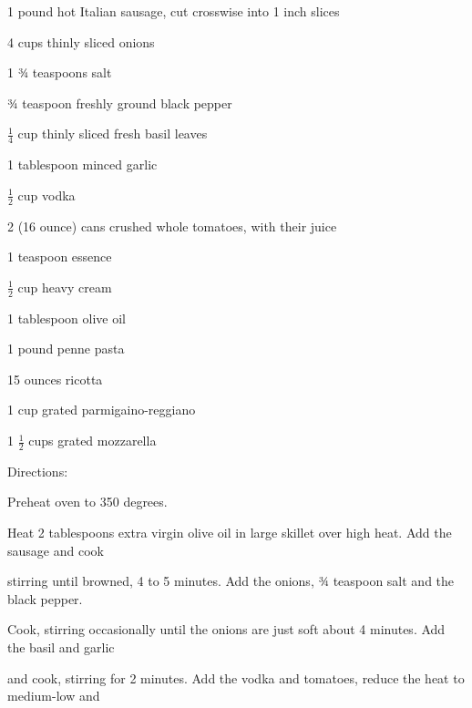 \documentclass[a4paper,portrait,12pt]{book}
\begin{document}
1 pound hot Italian sausage, cut crosswise into 1 inch slices




4 cups thinly sliced onions




1 ¾ teaspoons salt




¾ teaspoon freshly ground black pepper




$\frac{1}{4}$ cup thinly sliced fresh basil leaves




1 tablespoon minced garlic




$\frac{1}{2}$ cup vodka




2 (16 ounce) cans crushed whole tomatoes, with their juice




1 teaspoon essence




$\frac{1}{2}$ cup heavy cream




1 tablespoon olive oil




1 pound penne pasta




15 ounces ricotta




1 cup grated parmigaino-reggiano




1 $\frac{1}{2}$ cups grated mozzarella




Directions:




Preheat oven to 350 degrees.




Heat 2 tablespoons extra virgin olive oil in large skillet over high heat. Add the sausage and cook




stirring until browned, 4 to 5 minutes. Add the onions, ¾ teaspoon salt and the black pepper.




Cook, stirring occasionally until the onions are just soft about 4 minutes. Add the basil and garlic




and cook, stirring for 2 minutes. Add the vodka and tomatoes, reduce the heat to medium-low and
\end{document}

